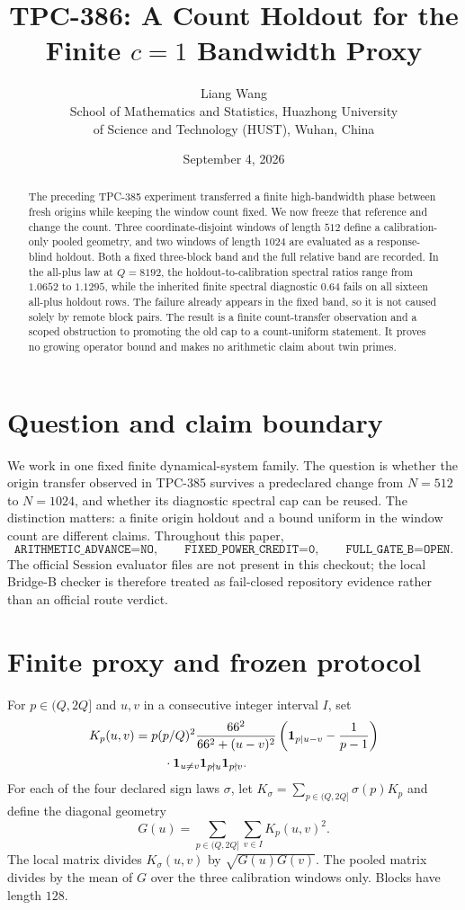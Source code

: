 \documentclass[10pt]{article}
\title{TPC-386: A Count Holdout for the Finite $c=1$ Bandwidth Proxy}
\author{Liang Wang\\
School of Mathematics and Statistics, Huazhong University\\
of Science and Technology (HUST), Wuhan, China}
\date{September 4, 2026}
\begin{document}
\maketitle

\begin{abstract}
The preceding TPC-385 experiment transferred a finite high-bandwidth phase
between fresh origins while keeping the window count fixed.  We now freeze
that reference and change the count.  Three coordinate-disjoint windows of
length $512$ define a calibration-only pooled geometry, and two windows of
length $1024$ are evaluated as a response-blind holdout.  Both a fixed
three-block band and the full relative band are recorded.  In the all-plus
law at $Q=8192$, the holdout-to-calibration spectral ratios range from
$1.0652$ to $1.1295$, while the inherited finite spectral diagnostic
$0.64$ fails on all sixteen all-plus holdout rows.  The failure already
appears in the fixed band, so it is not caused solely by remote block pairs.
The result is a finite count-transfer observation and a scoped obstruction
to promoting the old cap to a count-uniform statement.  It proves no
growing operator bound and makes no arithmetic claim about twin primes.
\end{abstract}

\section{Question and claim boundary}

We work in one fixed finite dynamical-system family.  The question is whether
the origin transfer observed in TPC-385 survives a predeclared change from
$N=512$ to $N=1024$, and whether its diagnostic spectral cap can be reused.
The distinction matters: a finite origin holdout and a bound uniform in the
window count are different claims.  Throughout this paper,
\[
 \texttt{ARITHMETIC\_ADVANCE=NO},\qquad
 \texttt{FIXED\_POWER\_CREDIT=0},\qquad
 \texttt{FULL\_GATE\_B=OPEN}.
\]
The official Session evaluator files are not present in this checkout; the
local Bridge-B checker is therefore treated as fail-closed repository
evidence rather than an official route verdict.

\section{Finite proxy and frozen protocol}

For $p\in(Q,2Q]$ and $u,v$ in a consecutive integer interval $I$, set
\begin{align*}
 K_p(u,v)={}&p(p/Q)^2\frac{66^2}{66^2+(u-v)^2}
 \left({\bf 1}_{p\mid u-v}-\frac{1}{p-1}\right)\\
 &\quad\cdot{\bf 1}_{u\ne v}{\bf 1}_{p\nmid u}{\bf 1}_{p\nmid v}.
\end{align*}
For each of the four declared sign laws $\sigma$, let
$K_\sigma=\sum_{p\in(Q,2Q]}\sigma(p)K_p$ and define the diagonal geometry
\[
 G(u)=\sum_{p\in(Q,2Q]}\sum_{v\in I}K_p(u,v)^2.
\]
The local matrix divides $K_\sigma(u,v)$ by
$\sqrt{G(u)G(v)}$.  The pooled matrix divides by the mean of $G$ over the
three calibration windows only.  Blocks have length $128$.
\end{document}

